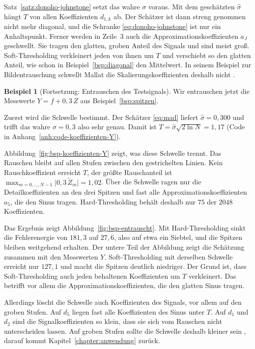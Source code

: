 \documentclass[a4paper,11pt,bibliography=totoc,listof=totoc,headinclude=true,cleardoublepage=empty,oneside]{scrbook}
\theoremstyle{plain}
\theoremstyle{definition}
\newtheorem{Beispiel}[Satz]{Beispiel}
\begin{document}
Satz~\ref{satz:donoho-johnstone} setzt das wahre $\sigma$ voraus. Mit dem
geschätzten $\hat\sigma$ hängt $T$ von allen Koeffizienten $d_{1,k}$ ab. Der
Schätzer ist dann streng genommen nicht mehr diagonal, und die Schranke
\eqref{eq:donoho-johnstone} ist nur ein Anhaltspunkt. Ferner werden in Zeile~3 auch die Approximationskoeffizienten
$a_J$ geschwellt. Sie tragen den glatten, groben Anteil des Signals und sind
meist gro\ss. Soft-Thresholding verkleinert jeden von ihnen um $T$ und
verschiebt so den glatten Anteil, wie schon in Beispiel~\ref{bsp:diagonal} den
Mittelwert. In seinem Beispiel zur Bildentrauschung schwellt Mallat die
Skalierungskoeffizienten deshalb nicht \cite[Kap.~11.3.2]{mallat}. %

\begin{Beispiel}[Fortsetzung: Entrauschen des Testsignals]
\label{bsp:mad-testsignal}
Wir entrauschen jetzt die Messwerte $Y = f + 0{,}3\,Z$ aus
Beispiel~\ref{bsp:spitzen}.

Zuerst wird die Schwelle bestimmt. Der Schätzer \eqref{eq:mad} liefert
$\hat\sigma = 0{,}300$ und trifft das wahre $\sigma = 0{,}3$ also sehr genau.
Damit ist $T = \hat\sigma\sqrt{2\ln N} = 1{,}17$ (Code in
Anhang~\ref{anh:code-koeffizienten-Y}).

Abbildung~\ref{fig:bsp-koeffizienten-Y} zeigt, was diese Schwelle trennt. Das
Rauschen bleibt auf allen Stufen zwischen den gestrichelten Linien. Kein
Rauschkoeffizient erreicht $T$, der grö\ss te Rauschanteil ist
$\max_{m=0,\dots,N-1}\lvert0{,}3\,\tilde Z_m\rvert = 1{,}02$. Über die Schwelle
ragen nur die Detailkoeffizienten an den drei Spitzen und fast alle
Approximationskoeffizienten $a_5$, die den Sinus tragen. Hard-Thresholding
behält deshalb nur $75$ der $2048$ Koeffizienten.

Das Ergebnis zeigt Abbildung~\ref{fig:bsp-entrauscht}. Mit Hard-Thresholding
sinkt die Fehlerenergie von $181{,}3$ auf $27{,}6$, also auf etwa ein Siebtel,
und die Spitzen bleiben weitgehend erhalten. Der untere Teil der Abbildung
zeigt die Schätzung zusammen mit den Messwerten $Y$. Soft-Thresholding mit
derselben Schwelle erreicht nur $127{,}1$ und macht die Spitzen deutlich
niedriger. Der Grund ist, dass Soft-Thresholding auch jeden behaltenen
Koeffizienten um $T$ verkleinert. Das betrifft vor allem die
Approximationskoeffizienten, die den glatten Sinus tragen.

Allerdings löscht die Schwelle auch Koeffizienten des Signals, vor allem auf
den groben Stufen. Auf $d_5$ liegen fast alle Koeffizienten des Sinus unter
$T$. Auf $d_1$ und $d_2$ sind die Signalkoeffizienten so klein, dass sie sich
vom Rauschen nicht unterscheiden lassen. Auf groben Stufen sollte die Schwelle
deshalb kleiner sein \cite[Kap.~11.3.1]{mallat}, %
darauf kommt Kapitel~\ref{chapter:anwendung} zurück.
\end{Beispiel}
\end{document}
